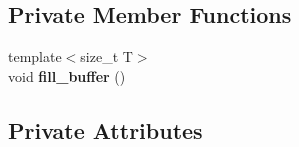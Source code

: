 \subsection*{Private Member Functions}
\begin{DoxyCompactItemize}
\item 
\mbox{\label{classnlohmann_1_1detail_1_1wide__string__input__adapter_ab718e44c524fa7ec74b0a0ae1ad64ca4}} 
{\footnotesize template$<$size\+\_\+t T$>$ }\\void {\bfseries fill\+\_\+buffer} ()
\end{DoxyCompactItemize}
\subsection*{Private Attributes}
